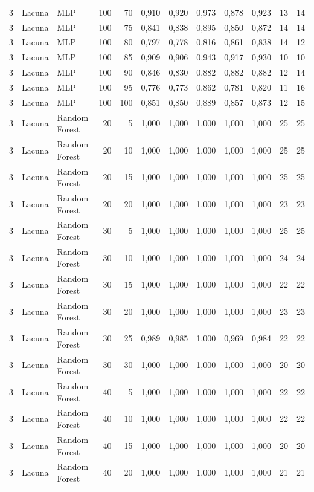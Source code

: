 \begin{longtable}{@{}rllrrrrrrrrr@{}}
3 & Lacuna & MLP & 100 & 70 & 0,910 & 0,920 & 0,973 & 0,878 & 0,923 & 13 & 14 \\
3 & Lacuna & MLP & 100 & 75 & 0,841 & 0,838 & 0,895 & 0,850 & 0,872 & 14 & 14 \\
3 & Lacuna & MLP & 100 & 80 & 0,797 & 0,778 & 0,816 & 0,861 & 0,838 & 14 & 12 \\
3 & Lacuna & MLP & 100 & 85 & 0,909 & 0,906 & 0,943 & 0,917 & 0,930 & 10 & 10 \\
3 & Lacuna & MLP & 100 & 90 & 0,846 & 0,830 & 0,882 & 0,882 & 0,882 & 12 & 14 \\
3 & Lacuna & MLP & 100 & 95 & 0,776 & 0,773 & 0,862 & 0,781 & 0,820 & 11 & 16 \\
3 & Lacuna & MLP & 100 & 100 & 0,851 & 0,850 & 0,889 & 0,857 & 0,873 & 12 & 15 \\
3 & Lacuna & Random Forest & 20 & 5 & 1,000 & 1,000 & 1,000 & 1,000 & 1,000 & 25 & 25 \\
3 & Lacuna & Random Forest & 20 & 10 & 1,000 & 1,000 & 1,000 & 1,000 & 1,000 & 25 & 25 \\
3 & Lacuna & Random Forest & 20 & 15 & 1,000 & 1,000 & 1,000 & 1,000 & 1,000 & 25 & 25 \\
3 & Lacuna & Random Forest & 20 & 20 & 1,000 & 1,000 & 1,000 & 1,000 & 1,000 & 23 & 23 \\
3 & Lacuna & Random Forest & 30 & 5 & 1,000 & 1,000 & 1,000 & 1,000 & 1,000 & 25 & 25 \\
3 & Lacuna & Random Forest & 30 & 10 & 1,000 & 1,000 & 1,000 & 1,000 & 1,000 & 24 & 24 \\
3 & Lacuna & Random Forest & 30 & 15 & 1,000 & 1,000 & 1,000 & 1,000 & 1,000 & 22 & 22 \\
3 & Lacuna & Random Forest & 30 & 20 & 1,000 & 1,000 & 1,000 & 1,000 & 1,000 & 23 & 23 \\
3 & Lacuna & Random Forest & 30 & 25 & 0,989 & 0,985 & 1,000 & 0,969 & 0,984 & 22 & 22 \\
3 & Lacuna & Random Forest & 30 & 30 & 1,000 & 1,000 & 1,000 & 1,000 & 1,000 & 20 & 20 \\
3 & Lacuna & Random Forest & 40 & 5 & 1,000 & 1,000 & 1,000 & 1,000 & 1,000 & 22 & 22 \\
3 & Lacuna & Random Forest & 40 & 10 & 1,000 & 1,000 & 1,000 & 1,000 & 1,000 & 22 & 22 \\
3 & Lacuna & Random Forest & 40 & 15 & 1,000 & 1,000 & 1,000 & 1,000 & 1,000 & 20 & 20 \\
3 & Lacuna & Random Forest & 40 & 20 & 1,000 & 1,000 & 1,000 & 1,000 & 1,000 & 21 & 21 \\

\end{longtable}
